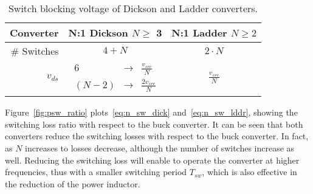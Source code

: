 \begin{table}[h]
\centering
\caption{Switch blocking voltage of Dickson and Ladder converters.}
\label{tab:Dick_Ladder_v_blk}
\renewcommand{\arraystretch}{1.5}%
\begin{tabular}{r | c  c   }
 Converter &  N:1 Dickson  $ N \geq$ 3  &  N:1 Ladder $ N \geq 2$  \\
 \midrule
\# Switches & $ 4 + N $  & $2 \cdot N$ \\
 $v_{ds}$ &     $\begin{array} {rcl} 6   & \to &  \frac{v_{src}}{N} \\
                                     (N - 2) & \to & \frac{2 v_{src}}{N}
                 \end{array}$
          &  $\frac{v_{src}}{N} $ \\
\end{tabular}
\end{table}

Figure~\ref{fig:psw_ratio} plots~\eqref{eq:n_sw_dick} and~\eqref{eq:n_sw_lddr}, showing the switching loss ratio with respect to the buck converter. It can be seen that both converters reduce the switching losses with respect to the buck converter. In fact, as $N$ increases to losses decrease, although the number of switches increase as well. Reducing the switching loss will enable to operate the converter at higher frequencies, thus with a smaller switching period $T_{sw}$, which is also effective in the reduction of the power inductor.

\begin{SCfigure}
\centering
{}
\caption{Switching loss ratio for Dickson and Ladder converters with respect to the buck converter.}
\label{fig:psw_ratio}
\end{SCfigure}

